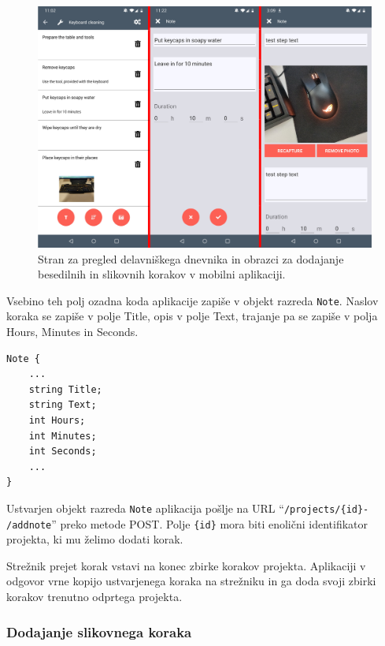 \documentclass[a4paper, 12pt]{book}
\begin{document}
\begin{figure}[H]
\begin{center}
	\includegraphics[width=13.5cm]{app_project_note}
\end{center}
	\caption{Stran za pregled delavniškega dnevnika in obrazci za dodajanje besedilnih in slikovnih korakov v mobilni aplikaciji.}
\label{app_project_note}
\end{figure}

Vsebino teh polj ozadna koda aplikacije zapiše v objekt razreda \texttt{Note}.
Naslov koraka se zapiše v polje Title, opis v polje Text, trajanje pa se zapiše v polja Hours, Minutes in Seconds.
\begin{verbatim}
Note { 
    ... 
    string Title; 
    string Text; 
    int Hours; 
    int Minutes;
    int Seconds;
    ...
}
\end{verbatim}

Ustvarjen objekt razreda \texttt{Note} aplikacija pošlje na URL \enquote{\texttt{/projects/\{id\}-\\/addnote}} preko metode POST.
Polje \texttt{\{id\}} mora biti enolični identifikator projekta, ki mu želimo dodati korak.

Strežnik prejet korak vstavi na konec zbirke korakov projekta.
Aplikaciji v odgovor vrne kopijo ustvarjenega koraka na strežniku in ga doda svoji zbirki korakov trenutno odprtega projekta.



\subsubsection{Dodajanje slikovnega koraka}
\end{document}
